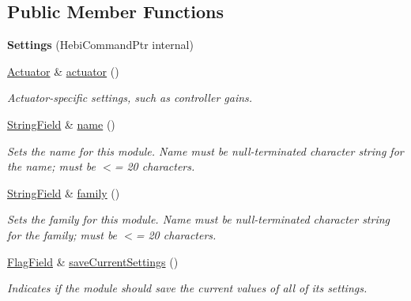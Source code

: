 \subsection*{Public Member Functions}
\begin{DoxyCompactItemize}
\item 
{\bfseries Settings} (Hebi\+Command\+Ptr internal)\hypertarget{classhebi_1_1Command_1_1Settings_a06498b4c88f3cb5567779ab350c312d9}{}\label{classhebi_1_1Command_1_1Settings_a06498b4c88f3cb5567779ab350c312d9}

\item 
\hyperlink{classhebi_1_1Command_1_1Settings_1_1Actuator}{Actuator} \& \hyperlink{classhebi_1_1Command_1_1Settings_a1514712e585fd0c00389fa82c214be33}{actuator} ()\hypertarget{classhebi_1_1Command_1_1Settings_a1514712e585fd0c00389fa82c214be33}{}\label{classhebi_1_1Command_1_1Settings_a1514712e585fd0c00389fa82c214be33}

\begin{DoxyCompactList}\small\item\em Actuator-\/specific settings, such as controller gains. \end{DoxyCompactList}\item 
\hyperlink{classhebi_1_1Command_1_1StringField}{String\+Field} \& \hyperlink{classhebi_1_1Command_1_1Settings_a86561f33ef1ceaa4e0e50e125433a4f7}{name} ()\hypertarget{classhebi_1_1Command_1_1Settings_a86561f33ef1ceaa4e0e50e125433a4f7}{}\label{classhebi_1_1Command_1_1Settings_a86561f33ef1ceaa4e0e50e125433a4f7}

\begin{DoxyCompactList}\small\item\em Sets the name for this module. Name must be null-\/terminated character string for the name; must be $<$= 20 characters. \end{DoxyCompactList}\item 
\hyperlink{classhebi_1_1Command_1_1StringField}{String\+Field} \& \hyperlink{classhebi_1_1Command_1_1Settings_a50847ab47e72c2edb25fdd88766eb18d}{family} ()\hypertarget{classhebi_1_1Command_1_1Settings_a50847ab47e72c2edb25fdd88766eb18d}{}\label{classhebi_1_1Command_1_1Settings_a50847ab47e72c2edb25fdd88766eb18d}

\begin{DoxyCompactList}\small\item\em Sets the family for this module. Name must be null-\/terminated character string for the family; must be $<$= 20 characters. \end{DoxyCompactList}\item 
\hyperlink{classhebi_1_1Command_1_1FlagField}{Flag\+Field} \& \hyperlink{classhebi_1_1Command_1_1Settings_aeaa64ec02978581bcf4d3d55ad4c3781}{save\+Current\+Settings} ()\hypertarget{classhebi_1_1Command_1_1Settings_aeaa64ec02978581bcf4d3d55ad4c3781}{}\label{classhebi_1_1Command_1_1Settings_aeaa64ec02978581bcf4d3d55ad4c3781}

\begin{DoxyCompactList}\small\item\em Indicates if the module should save the current values of all of its settings. \end{DoxyCompactList}\end{DoxyCompactItemize}


